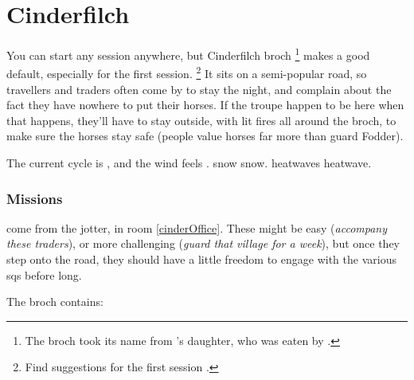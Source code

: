 \section{Cinderfilch }
\label{cinderfilch}




\begin{multicols}{2}

\noindent
You can start any session anywhere, but Cinderfilch \gls{broch}%
\footnote{The \gls{broch} took its name from 's daughter, who was eaten by .}
makes a good default, especially for the first session.%
\footnote{Find suggestions for the first session .}
It sits on a semi-popular road, so travellers and traders often come by to stay the night, and complain about the fact they have nowhere to put their horses.
If the troupe happen to be here when that happens, they'll have to stay outside, with lit fires all around the \gls{broch}, to make sure the horses stay safe (people value horses far more than \gls{guard} Fodder).

The current \gls{cycle} is \showCycle, and the wind feels \showTemperature.
\ifcase\value{temperature}%
  \Gls{snow} \glsdesc{snow}.
\or%
\or%
\else%
  \Glspl{heatwave} \glsdesc{heatwave}.
\fi%

\subsubsection{Missions}
come from the \gls{jotter}, in room \ref{cinderOffice}.%
These might be easy (\textit{accompany these traders}), or more challenging (\textit{guard that \gls{village} for a week}), but once they step onto the road, they should have a little freedom to engage with the various \glspl{sq} before long.

The \gls{broch} contains:

\null


\end{multicols}
